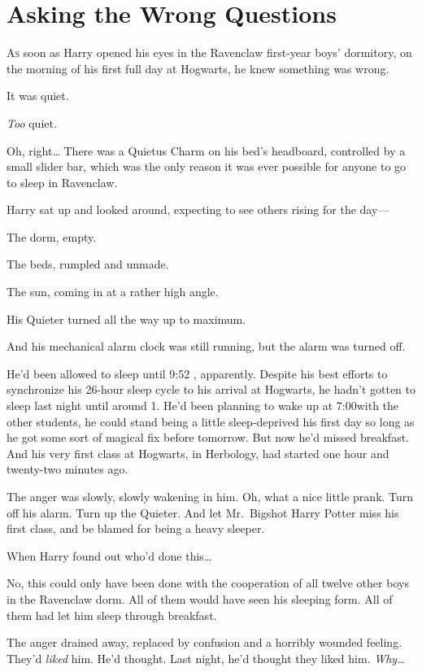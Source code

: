 \chapter{Asking the Wrong Questions}

\lettrine{A}{s} soon as Harry opened his eyes in the Ravenclaw first-year boys' dormitory,
on the morning of his first full day at Hogwarts, he knew something was wrong.

It was quiet.

\emph{Too} quiet.

Oh, right{\ldots} There was a Quietus Charm on his bed's headboard, controlled
by a small slider bar, which was the only reason it was ever possible for
anyone to go to sleep in Ravenclaw.

Harry sat up and looked around, expecting to see others rising for the day---

The dorm, empty.

The beds, rumpled and unmade.

The sun, coming in at a rather high angle.

His Quieter turned all the way up to maximum.

And his mechanical alarm clock was still running, but the alarm was turned off.

He'd been allowed to sleep until 9:52 \AM, apparently. Despite his best efforts
to synchronize his 26-hour sleep cycle to his arrival at Hogwarts, he hadn't
gotten to sleep last night until around 1\AM. He'd been planning to wake up at
7:00\AM with the other students, he could stand being a little sleep-deprived
his first day so long as he got some sort of magical fix before tomorrow. But
now he'd missed breakfast. And his very first class at Hogwarts, in Herbology,
had started one hour and twenty-two minutes ago.

The anger was slowly, slowly wakening in him. Oh, what a nice little prank.
Turn off his alarm. Turn up the Quieter. And let Mr.~Bigshot Harry Potter miss
his first class, and be blamed for being a heavy sleeper.

When Harry found out who'd done this{\ldots}

No, this could only have been done with the cooperation of all twelve other
boys in the Ravenclaw dorm. All of them would have seen his sleeping form. All
of them had let him sleep through breakfast.

The anger drained away, replaced by confusion and a horribly wounded feeling.
They'd \emph{liked} him. He'd thought. Last night, he'd thought they liked him.
\emph{Why{\ldots}}

